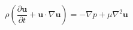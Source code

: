 \documentclass[preview,border=2pt]{standalone}
\begin{document}
\[
\rho\left(\frac{\partial \mathbf{u}}{\partial t}+\mathbf{u}\cdot\nabla\mathbf{u}\right)=-\nabla p+\mu\nabla^{2}\mathbf{u}
\]
\end{document}
